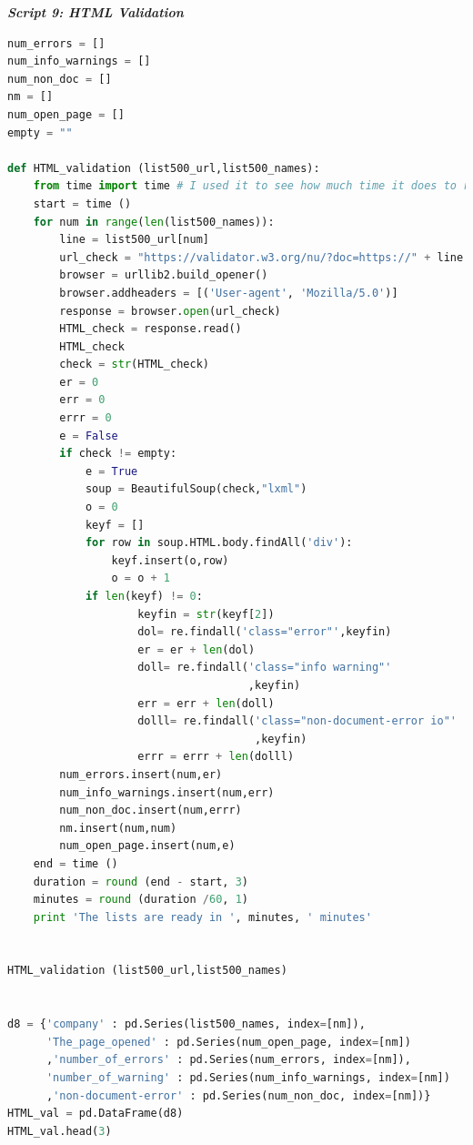 \documentclass{book}
\begin{document}
\begin{center}
\textit{\textbf{Script 9: HTML Validation}}\label{p9}
\end{center}
\begin{lstlisting}[language=Python]
num_errors = []
num_info_warnings = []
num_non_doc = [] 
nm = []
num_open_page = []
empty = ""
 
def HTML_validation (list500_url,list500_names):
    from time import time # I used it to see how much time it does to run the function
    start = time ()
    for num in range(len(list500_names)):
        line = list500_url[num] 
        url_check = "https://validator.w3.org/nu/?doc=https://" + line
        browser = urllib2.build_opener()
        browser.addheaders = [('User-agent', 'Mozilla/5.0')]
        response = browser.open(url_check)
        HTML_check = response.read()
        HTML_check
        check = str(HTML_check)
        er = 0
        err = 0
        errr = 0
        e = False
        if check != empty:
            e = True
            soup = BeautifulSoup(check,"lxml")
            o = 0
            keyf = []
            for row in soup.HTML.body.findAll('div'):
                keyf.insert(o,row)
                o = o + 1                    
            if len(keyf) != 0:       
                    keyfin = str(keyf[2])                     
                    dol= re.findall('class="error"',keyfin)            
                    er = er + len(dol)
                    doll= re.findall('class="info warning"'
                                     ,keyfin)            
                    err = err + len(doll)
                    dolll= re.findall('class="non-document-error io"'
                                      ,keyfin)            
                    errr = errr + len(dolll)
        num_errors.insert(num,er)
        num_info_warnings.insert(num,err)
        num_non_doc.insert(num,errr)  
        nm.insert(num,num) 
        num_open_page.insert(num,e)
    end = time ()
    duration = round (end - start, 3)
    minutes = round (duration /60, 1)
    print 'The lists are ready in ', minutes, ' minutes'
 

HTML_validation (list500_url,list500_names)
 

d8 = {'company' : pd.Series(list500_names, index=[nm]),
      'The_page_opened' : pd.Series(num_open_page, index=[nm])
      ,'number_of_errors' : pd.Series(num_errors, index=[nm]),
      'number_of_warning' : pd.Series(num_info_warnings, index=[nm])
      ,'non-document-error' : pd.Series(num_non_doc, index=[nm])}
HTML_val = pd.DataFrame(d8)    
HTML_val.head(3) 
\end{lstlisting}
\end{document}
